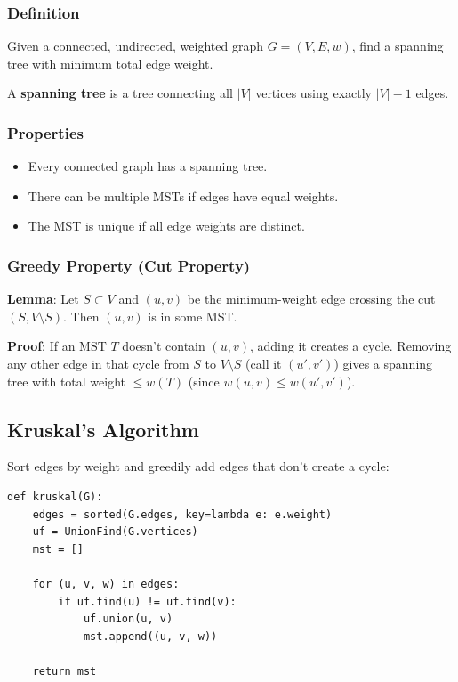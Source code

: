 \documentclass[11pt]{article}
\begin{document}
{{{\subsubsection*{Definition}
Given a connected, undirected, weighted graph $G = (V, E, w)$, find a spanning tree with minimum total edge weight.

A \textbf{spanning tree} is a tree connecting all $|V|$ vertices using exactly $|V| - 1$ edges.

\subsubsection*{Properties}
\begin{itemize}
\item Every connected graph has a spanning tree.
\item There can be multiple MSTs if edges have equal weights.
\item The MST is unique if all edge weights are distinct.
\end{itemize}

\subsubsection*{Greedy Property (Cut Property)}
\textbf{Lemma}: Let $S \subset V$ and $(u, v)$ be the minimum-weight edge crossing the cut $(S, V \setminus S)$. Then $(u, v)$ is in some MST.

\textbf{Proof}: If an MST $T$ doesn't contain $(u, v)$, adding it creates a cycle. Removing any other edge in that cycle from $S$ to $V \setminus S$ (call it $(u', v')$) gives a spanning tree with total weight $\le w(T)$ (since $w(u,v) \le w(u',v')$).

\subsection*{Kruskal's Algorithm}

Sort edges by weight and greedily add edges that don't create a cycle:

\begin{lstlisting}
def kruskal(G):
    edges = sorted(G.edges, key=lambda e: e.weight)
    uf = UnionFind(G.vertices)
    mst = []
    
    for (u, v, w) in edges:
        if uf.find(u) != uf.find(v):
            uf.union(u, v)
            mst.append((u, v, w))
    
    return mst
\end{lstlisting}

}}}
\end{document}
